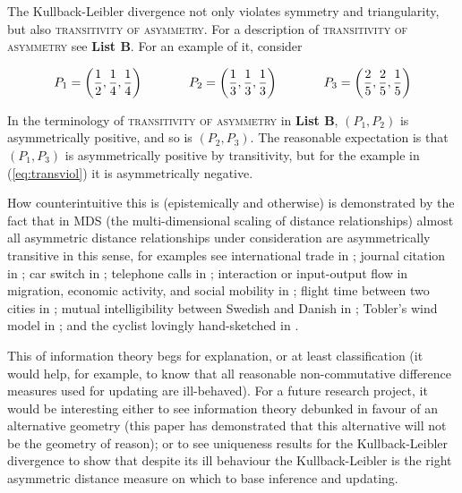 \documentclass[smallextended]{svjour3}       %
\begin{document}
The Kullback-Leibler divergence not only violates symmetry and
triangularity, but also \textsc{transitivity of asymmetry}. For a
description of \textsc{transitivity of asymmetry} see \textbf{List B}.
For an example of it, consider

\begin{equation}
  \label{eq:transviol}
    P_{1}=\left(\frac{1}{2},\frac{1}{4},\frac{1}{4}\right)  \hspace{.5in}
    P_{2}=\left(\frac{1}{3},\frac{1}{3},\frac{1}{3}\right) \hspace{.5in}
    P_{3}=\left(\frac{2}{5},\frac{2}{5},\frac{1}{5}\right)
\end{equation}

In the terminology of \textsc{transitivity of asymmetry} in \textbf{List B},
$(P_{1},P_{2})$ is asymmetrically positive, and so is $(P_{2},P_{3})$.
The reasonable expectation is that $(P_{1},P_{3})$ is asymmetrically
positive by transitivity, but for the example in (\ref{eq:transviol})
it is asymmetrically negative.

How counterintuitive this is (epistemically and otherwise) is
demonstrated by the fact that in MDS (the multi-dimensional scaling of
distance relationships) almost all asymmetric distance relationships
under consideration are asymmetrically transitive in this sense, for
examples see international trade in ; journal
citation in ; car switch in
; telephone calls in
; interaction or input-output flow in
migration, economic activity, and social mobility in
; flight time between two cities in
; mutual intelligibility between Swedish
and Danish in ; Tobler's wind model in
; and the cyclist lovingly hand-sketched in
.

This  of information theory begs for explanation,
or at least classification (it would help, for example, to know that
all reasonable non-commutative difference measures used for updating
are ill-behaved). For a future research project, it would be
interesting either to see information theory debunked in favour of an
alternative geometry (this paper has demonstrated that this
alternative will not be the geometry of reason); or to see uniqueness
results for the Kullback-Leibler divergence to show that despite its
ill behaviour the Kullback-Leibler is the right asymmetric distance
measure on which to base inference and updating.
\end{document}
